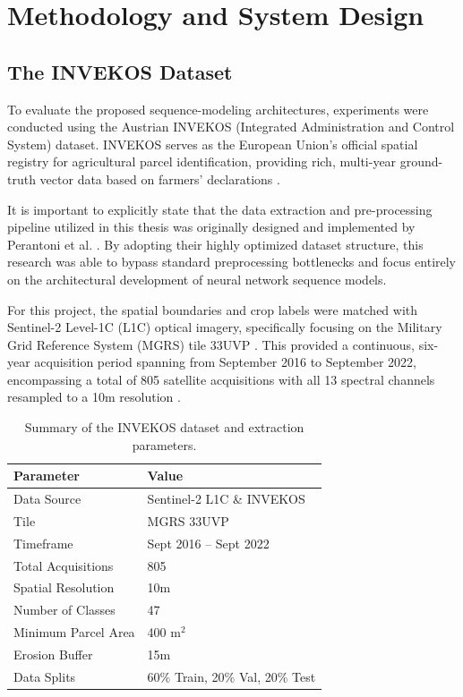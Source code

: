 \chapter{Methodology and System Design}
\label{cha:methodology_sys_design}


\section{The INVEKOS Dataset}
\label{sec:invek_dataset}

To evaluate the proposed sequence-modeling architectures, experiments were conducted using the Austrian INVEKOS (Integrated Administration and Control System) dataset.
INVEKOS serves as the European Union's official spatial registry for agricultural parcel identification, providing rich,
multi-year ground-truth vector data based on farmers' declarations \cite{perantoni_bayesian_2024}. 

It is important to explicitly state that the data extraction and pre-processing pipeline utilized in this thesis was originally designed and
implemented by Perantoni et al. \cite{perantoni_bayesian_2024}. By adopting their highly optimized dataset structure,
this research was able to bypass standard preprocessing bottlenecks and focus entirely on the architectural development of neural network sequence models. 

For this project, the spatial boundaries and crop labels were matched with Sentinel-2 Level-1C (L1C) optical imagery,
specifically focusing on the Military Grid Reference System (MGRS) tile 33UVP \cite{perantoni_bayesian_2024}.
This provided a continuous, six-year acquisition period spanning from September 2016 to September 2022,
encompassing a total of 805 satellite acquisitions with all 13 spectral channels resampled to a 10m resolution \cite{perantoni_bayesian_2024}.

\begin{table}[htpb]
    \centering
    \renewcommand{\arraystretch}{1.2}
    \begin{tabular}{ll}
        \toprule
        \textbf{Parameter} & \textbf{Value} \\
        \midrule
        Data Source & Sentinel-2 L1C \& INVEKOS \\
        Tile & MGRS 33UVP \\
        Timeframe & Sept 2016 -- Sept 2022 \\
        Total Acquisitions & 805 \\
        Spatial Resolution & 10m \\
        Number of Classes & 47 \\
        Minimum Parcel Area & 400 m$^2$ \\
        Erosion Buffer & 15m \\
        Data Splits & 60\% Train, 20\% Val, 20\% Test \\
        \bottomrule
    \end{tabular}
    \caption{Summary of the INVEKOS dataset and extraction parameters.}
    \label{tab:dataset_params}
\end{table}

